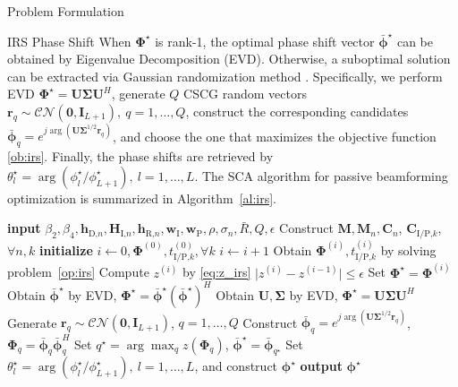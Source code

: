 \documentclass[journal]{IEEEtran}
\begin{document}
\begin{section}{Problem Formulation}
\begin{subsection}{IRS Phase Shift}
			When $\boldsymbol{\Phi}^{\star}$ is rank-\num{1}, the optimal phase shift vector $\bar{\boldsymbol{\phi}}^\star$ can be obtained by Eigenvalue Decomposition (EVD). Otherwise, a suboptimal solution can be extracted via Gaussian randomization method \cite{Huang2010}. Specifically, we perform EVD $\boldsymbol{\Phi}^{\star}=\boldsymbol{U}\boldsymbol{\Sigma}\boldsymbol{U}^H$, generate $Q$ CSCG random vectors $\boldsymbol{r}_q \sim \mathcal{CN}(\boldsymbol{0},\boldsymbol{I}_{L+1}),\ q=1,\dots,Q$, construct the corresponding candidates $\bar{\boldsymbol{\phi}}_q=e^{j\arg\left(\boldsymbol{U}\boldsymbol{\Sigma}^{1/2}\boldsymbol{r}_q\right)}$, and choose the one that maximizes the objective function \eqref{ob:irs}. Finally, the phase shifts are retrieved by $\theta_l^{\star}=\arg(\phi_l^\star/\phi_{L+1}^\star), \ l=1,\dots,L$. The SCA algorithm for passive beamforming optimization is summarized in Algorithm~\ref{al:irs}.
			\begin{algorithm}[!t]
				\caption{SCA: IRS Phase Shift.}
				\label{al:irs}
				\begin{algorithmic}[1]
					\State \textbf{input} $\beta_2,\beta_4,\boldsymbol{h}_{\text{D,}n},\boldsymbol{H}_{\text{I,}n},\boldsymbol{h}_{\text{R,}n},\boldsymbol{w}_{\text{I}},\boldsymbol{w}_\text{P},\rho,\sigma_n,\bar{R},Q,\epsilon$
					\State Construct $\boldsymbol{M},\boldsymbol{M}_n,\boldsymbol{C}_{n}$, $\boldsymbol{C}_{\text{I/P,}k}$, $\forall n,k$
					\State \textbf{initialize} $i \gets 0,\boldsymbol{\Phi}^{(0)},t_{\text{I/P,}k}^{(0)}, \forall k$
					\Repeat
						\State $i \gets i + 1$
						\State Obtain $\boldsymbol{\Phi}^{(i)}, t_{\text{I/P,}k}^{(i)}$ by solving problem~\eqref{op:irs}
						\State Compute $z^{(i)}$ by \eqref{eq:z_irs}
					\Until $\lvert z^{(i)}-z^{(i-1)} \rvert \le \epsilon$
					\State Set $\boldsymbol{\Phi}^{\star}=\boldsymbol{\Phi}^{(i)}$
						\State Obtain $\bar{\boldsymbol{\phi}}^\star$ by EVD, $\boldsymbol{\Phi}^{\star}=\bar{\boldsymbol{\phi}}^\star(\bar{\boldsymbol{\phi}}^\star)^H$
					\Else
						\State Obtain $\boldsymbol{U},\boldsymbol{\Sigma}$ by EVD, $\boldsymbol{\Phi}^{\star}=\boldsymbol{U}\boldsymbol{\Sigma}\boldsymbol{U}^H$
						\State Generate $\boldsymbol{r}_q \sim \mathcal{CN}(\boldsymbol{0},\boldsymbol{I}_{L+1})$, $q=1,\dots,Q$
						\State Construct $\bar{\boldsymbol{\phi}}_q=e^{j\arg\left(\boldsymbol{U}\boldsymbol{\Sigma}^{1/2}\boldsymbol{r}_q\right)}$, $\boldsymbol{\Phi}_q=\bar{\boldsymbol{\phi}}_q\bar{\boldsymbol{\phi}}_q^H$
						\State Set $q^{\star}=\arg\max_q{z(\boldsymbol{\Phi}_q)}$, $\bar{\boldsymbol{\phi}}^\star=\bar{\boldsymbol{\phi}}_{q^{\star}}$
					\EndIf
					\State Set $\theta_l^\star=\arg(\phi_l^\star/\phi_{L+1}^\star), \ l=1,\dots,L$, and construct $\boldsymbol{\phi}^{\star}$
					\State \textbf{output} $\boldsymbol{\phi}^{\star}$
				\end{algorithmic}
			\end{algorithm}
		\end{subsection}



\end{section}
\end{document}
